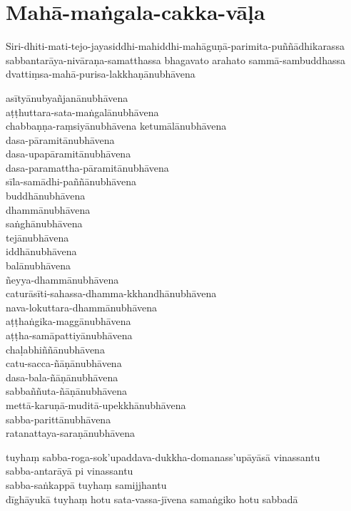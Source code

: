 
\section{Mahā-maṅgala-cakka-vāḷa}


Siri-dhiti-mati-tejo-jayasiddhi-mahiddhi-mahāguṇā-parimita-puññādhikarassa
sabbantarāya-nivāraṇa-samatthassa bhagavato arahato sammā-sambuddhassa
dvattiṃsa-mahā-purisa-lakkhaṇānubhāvena

asītyānubyañjanānubhāvena\\
aṭṭhuttara-sata-maṅgalānubhāvena\\
chabbaṇṇa-raṃsiyānubhāvena ketumālānubhāvena\\
dasa-pāramitānubhāvena\\
dasa-upapāramitānubhāvena\\
dasa-paramattha-pāramitānubhāvena\\
sīla-samādhi-paññānubhāvena\\
buddhānubhāvena\\
dhammānubhāvena\\
saṅghānubhāvena\\
tejānubhāvena\\
iddhānubhāvena\\
balānubhāvena\\
ñeyya-dhammānubhāvena\\
caturāsīti-sahassa-dhamma-kkhandhānubhāvena\\
nava-lokuttara-dhammānubhāvena\\
aṭṭhaṅgika-maggānubhāvena\\
aṭṭha-samāpattiyānubhāvena\\
chaḷabhiññānubhāvena\\
catu-sacca-ñāṇānubhāvena\\
dasa-bala-ñāṇānubhāvena\\
sabbaññuta-ñāṇānubhāvena\\
mettā-karuṇā-muditā-upekkhānubhāvena\\
sabba-parittānubhāvena\\
ratanattaya-saraṇānubhāvena

tuyhaṃ sabba-roga-sok'upaddava-dukkha-domanass'upāyāsā vinassantu\\
sabba-antarāyā pi vinassantu\\
sabba-saṅkappā tuyhaṃ samijjhantu\\
dīghāyukā tuyhaṃ hotu sata-vassa-jīvena samaṅgiko hotu sabbadā

